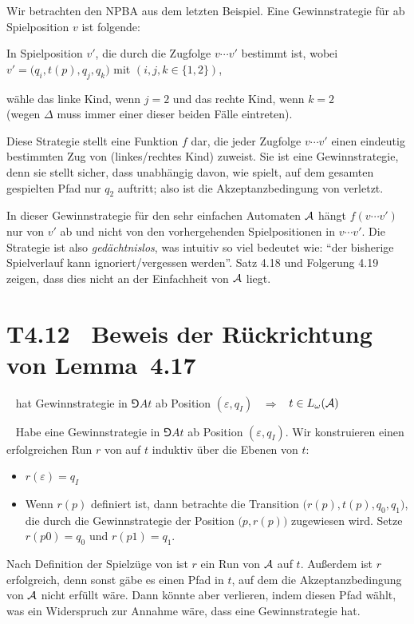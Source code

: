 \documentclass[fontsize=11pt, twoside=false, numbers=autoenddot]{scrbook}
\begin{document}
Wir betrachten den NPBA \Amc aus dem letzten Beispiel.
Eine Gewinnstrategie für \PF ab Spielposition $v$ ist folgende:
%
\begin{center}
  \parbox{.8\linewidth}{%
    In Spielposition $v'$, die durch die Zugfolge $v\cdots v'$ bestimmt ist,
    wobei $v'=\big(q_i,t(p),q_j,q_k\big)$ mit $(i,j,k \in \{1,2\})$,
    \par\smallskip
    wähle das linke Kind, wenn $j=2$ und das rechte Kind, wenn $k=2$\\
    (wegen $\Delta$ muss immer einer dieser beiden Fälle eintreten).%
  }
\end{center}
%
Diese Strategie stellt eine Funktion $f$ dar, die jeder Zugfolge $v\cdots v'$
einen eindeutig bestimmten Zug von \PF (linkes/rechtes Kind) zuweist.
Sie ist eine Gewinnstrategie, denn sie stellt sicher, dass unabhängig davon, wie \AUT spielt,
auf dem gesamten gespielten Pfad nur $q_2$ auftritt; also ist die Akzeptanzbedingung
von \Amc verletzt.

\goodbreak
In dieser Gewinnstrategie für den sehr einfachen Automaten $\mathcal{A}$ hängt
$f(v\cdots v')$ nur von $v'$ ab und nicht von den vorhergehenden Spielpositionen
in $v\cdots v'$. Die Strategie ist also \emph{gedächtnislos},
was intuitiv so viel bedeutet wie: "`der bisherige Spielverlauf kann
ignoriert/vergessen werden"'.
Satz 4.18 und Folgerung 4.19 zeigen, dass dies nicht an der
Einfachheit von $\mathcal{A}$ liegt.

\goodbreak
\section*{T4.12~ Beweis der Rückrichtung von Lemma~4.17}

~
\AUT hat Gewinnstrategie in $\Game{A}{t}$ ab Position $(\varepsilon,q_I)$ ~$\Rightarrow$~ $t \in L_\omega(\mathcal{A})$

\par\medskip
{}~
Habe \AUT eine Gewinnstrategie in $\Game{A}{t}$ ab Position $(\varepsilon,q_I)$.
Wir konstruieren einen erfolgreichen Run $r$ von \Amc auf $t$
induktiv über die Ebenen von $t$:
%
\begin{itemize}
  \item
    $r(\varepsilon) = q_I$
  \item
    Wenn $r(p)$ definiert ist,
    dann betrachte die Transition $\big(r(p),t(p),q_0,q_1\big)$,
    die durch die Gewinnstrategie der Position $\big(p,r(p)\big)$
    zugewiesen wird.
    Setze $r(p0) = q_0$ und $r(p1) = q_1$.
\end{itemize}
%
Nach Definition der Spielzüge von \AUT ist $r$ ein Run von $\mathcal{A}$ auf $t$.
Außerdem ist $r$ erfolgreich,
denn sonst gäbe es einen Pfad in $t$, auf dem die Akzeptanzbedingung von $\mathcal{A}$
nicht erfüllt wäre. Dann könnte aber \AUT verlieren, indem \PF diesen Pfad wählt,
was ein Widerspruch zur Annahme wäre, dass \AUT eine Gewinnstrategie hat.
\qedhere
\end{document}
